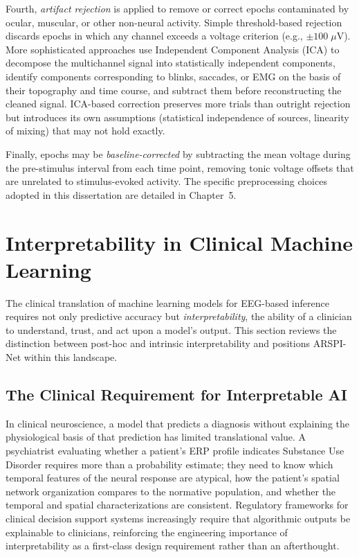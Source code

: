 Fourth, \emph{artifact rejection} is applied to remove or correct epochs contaminated by ocular, muscular, or other non-neural activity. Simple threshold-based rejection discards epochs in which any channel exceeds a voltage criterion (e.g., $\pm 100\;\mu$V). More sophisticated approaches use Independent Component Analysis (ICA) \cite{delorme_eeglab_2004} to decompose the multichannel signal into statistically independent components, identify components corresponding to blinks, saccades, or EMG on the basis of their topography and time course, and subtract them before reconstructing the cleaned signal. ICA-based correction preserves more trials than outright rejection but introduces its own assumptions (statistical independence of sources, linearity of mixing) that may not hold exactly.

Finally, epochs may be \emph{baseline-corrected} by subtracting the mean voltage during the pre-stimulus interval from each time point, removing tonic voltage offsets that are unrelated to stimulus-evoked activity. The specific preprocessing choices adopted in this dissertation are detailed in Chapter~5.


\section{Interpretability in Clinical Machine Learning}
\label{sec:interpretability_background}

The clinical translation of machine learning models for EEG-based inference requires not only predictive accuracy but \emph{interpretability}, the ability of a clinician to understand, trust, and act upon a model's output. This section reviews the distinction between post-hoc and intrinsic interpretability and positions ARSPI-Net within this landscape.

\subsection{The Clinical Requirement for Interpretable AI}

In clinical neuroscience, a model that predicts a diagnosis without explaining the physiological basis of that prediction has limited translational value. A psychiatrist evaluating whether a patient's ERP profile indicates Substance Use Disorder requires more than a probability estimate; they need to know which temporal features of the neural response are atypical, how the patient's spatial network organization compares to the normative population, and whether the temporal and spatial characterizations are consistent. Regulatory frameworks for clinical decision support systems increasingly require that algorithmic outputs be explainable to clinicians, reinforcing the engineering importance of interpretability as a first-class design requirement rather than an afterthought.

